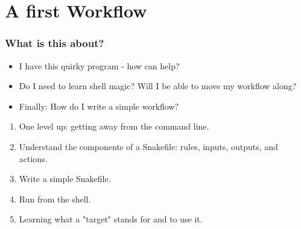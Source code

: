 \section{A first Workflow}
{   
}

\begin{frame}
  \frametitle{What is this about?}
   \begin{question}[Questions]
   	  \begin{itemize}
   	  	\item I have this quirky program - how can \Snakemake help?
   	  	\item Do I need to learn shell magic? Will I be able to move my workflow along?
   	  	\item Finally: How do I write a simple workflow?
   	  \end{itemize}
   \end{question}
   \begin{docs}[Objectives]
   	 \begin{enumerate}
   	 	 \item One level up: getting away from the command line.
         \item Understand the components of a Snakefile: rules, inputs, outputs, and actions.
         \item Write a simple Snakefile.
         \item Run \Snakemake from the shell.
         \item Learning what a "target" stands for and to use it.
     \end{enumerate}
   \end{docs}
\end{frame}


